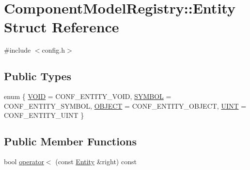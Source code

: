 \hypertarget{struct_component_model_registry_1_1_entity}{\section{Component\+Model\+Registry\+:\+:Entity Struct Reference}
\label{struct_component_model_registry_1_1_entity}
}


{\ttfamily \#include $<$config.\+h$>$}

\subsection*{Public Types}
\begin{DoxyCompactItemize}
\item 
enum \{ \hyperlink{struct_component_model_registry_1_1_entity_a96edcf9f28baf1e1618c65544a28137da99ff0e5f2fa2affc4f3b576dae396763}{V\+O\+I\+D} = C\+O\+N\+F\+\_\+\+E\+N\+T\+I\+T\+Y\+\_\+\+V\+O\+I\+D, 
\hyperlink{struct_component_model_registry_1_1_entity_a96edcf9f28baf1e1618c65544a28137da53e7a7a36cb2929eea712e127430d46d}{S\+Y\+M\+B\+O\+L} = C\+O\+N\+F\+\_\+\+E\+N\+T\+I\+T\+Y\+\_\+\+S\+Y\+M\+B\+O\+L, 
\hyperlink{struct_component_model_registry_1_1_entity_a96edcf9f28baf1e1618c65544a28137daf14a2bc1c9e5e55f6c0b32972a5e1da5}{O\+B\+J\+E\+C\+T} = C\+O\+N\+F\+\_\+\+E\+N\+T\+I\+T\+Y\+\_\+\+O\+B\+J\+E\+C\+T, 
\hyperlink{struct_component_model_registry_1_1_entity_a96edcf9f28baf1e1618c65544a28137da1cc762a8642e3ca1289b8a7b85533661}{U\+I\+N\+T} = C\+O\+N\+F\+\_\+\+E\+N\+T\+I\+T\+Y\+\_\+\+U\+I\+N\+T
 \}
\end{DoxyCompactItemize}
\subsection*{Public Member Functions}
\begin{DoxyCompactItemize}
\item 
bool \hyperlink{struct_component_model_registry_1_1_entity_a871d089078b8c2e9b34fd3ebe321b3f4}{operator$<$} (const \hyperlink{struct_component_model_registry_1_1_entity}{Entity} \&right) const 
\end{DoxyCompactItemize}
